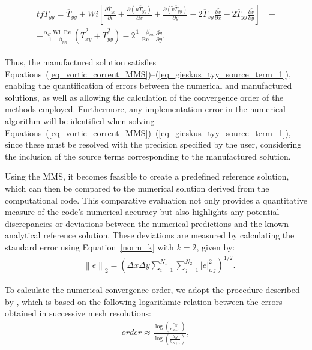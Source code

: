 \documentclass[preprint, 12pt]{elsarticle}
\begin{document}
\begin{gather}
    \begin{aligned}
        tfT_{yy} = \overline{T}_{yy} + Wi\left[\frac{\partial \overline{T}_{yy}}{\partial t} + \frac{\partial (\overline{u}\overline{T}_{yy})}{\partial x} + \frac{\partial(\widetilde{v}\overline{T}_{yy})}{\partial y} - 2\overline{T}_{xy}\frac{\partial\widetilde{v}}{\partial x} - 2\overline{T}_{yy}\frac{\partial\widetilde{v}}{\partial y}\right] &~+ \\ + \frac{\alpha_{G}\operatorname{Wi}\operatorname{Re}}{1-\beta_{nn}}\left(\overline{T}_{xy}^{2} + \overline{T}_{yy}^{2}\right) - 2\frac{1-\beta_{nn}}{\operatorname{Re}}\frac{\partial\widetilde{v}}{\partial y}.\label{eq_tyy_s_t_2}
    \end{aligned}
\end{gather}

Thus, the manufactured solution satisfies Equations~(\ref{eq_vortic_corrent_MMS})--(\ref{eq_gieskus_tyy_source_term_1}), enabling the quantification of errors between the numerical and manufactured solutions, as well as allowing the calculation of the convergence order of the methods employed. Furthermore, any implementation error in the numerical algorithm will be identified when solving Equations~(\ref{eq_vortic_corrent_MMS})--(\ref{eq_gieskus_tyy_source_term_1}), since these must be resolved with the precision specified by the user, considering the inclusion of the source terms corresponding to the manufactured solution.

Using the MMS, it becomes feasible to create a predefined reference solution, which can then be compared to the numerical solution derived from the computational code. This comparative evaluation not only provides a quantitative measure of the code's numerical accuracy but also highlights any potential discrepancies or deviations between the numerical predictions and the known analytical reference solution. These deviations are measured by calculating the standard error using Equation~\eqref{norm_k} with $k = 2$, given by:
\begin{align}
    &\left \|e\right \|_{2}=\left(\Delta x \Delta y \sum_{i=1}^{N_{1}}\sum_{j=1}^{N_{2}} \left |e\right |_{i,j}^{2}\right)^{1/2}.\label{norm_k_equal_2}
\end{align}

To calculate the numerical convergence order, we adopt the procedure described by \citet{leveque2007finite}, which is based on the following logarithmic relation between the errors obtained in successive mesh resolutions:
\begin{align}
    order \approx \frac{\log\left(\frac{e_{N}}{e_{N+1}}\right)}{\log\left(\frac{h_{N}}{h_{N+1}}\right)},\label{log_p}
\end{align}
\end{document}
